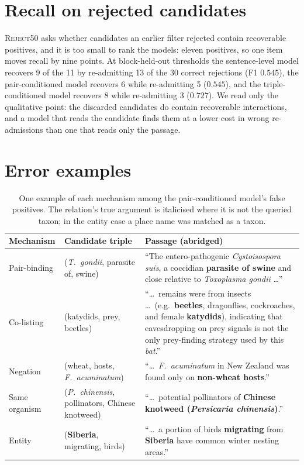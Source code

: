 \documentclass[11pt]{article}
\begin{document}
\section{Recall on rejected candidates}
\label{sec:recall}
\textsc{Reject50} asks whether candidates an earlier filter rejected contain recoverable
positives, and it is too small to rank the models: eleven positives, so one item moves recall by
nine points. At block-held-out thresholds the sentence-level model recovers 9 of the 11 by
re-admitting 13 of the 30 correct rejections (F1 $0.545$), the pair-conditioned model recovers 6
while re-admitting 5 ($0.545$), and the triple-conditioned model recovers 8 while re-admitting 3
($0.727$). We read only the qualitative point: the discarded candidates do contain recoverable
interactions, and a model that reads the candidate finds them at a lower cost in wrong
re-admissions than one that reads only the passage.

\section{Error examples}
\label{app:examples}

\begin{table}[t]\centering\small
\begin{tabular}{@{}llp{}@{}}
\toprule
Mechanism & Candidate triple & Passage (abridged) \\
\midrule
Pair-binding & (\emph{T.\ gondii}, parasite of, swine) &
``The entero-pathogenic \emph{Cystoisospora suis}, a coccidian \textbf{parasite of swine} and close
relative to \emph{Toxoplasma gondii} \ldots'' \\[1pt]
Co-listing & (katydids, prey, beetles) &
``\ldots\ remains were from insects \ldots\ (e.g.\ \textbf{beetles}, dragonflies, cockroaches, and
female \textbf{katydids}), indicating that eavesdropping on prey signals is not the only
prey-finding strategy used by this \emph{bat}.'' \\[1pt]
Negation & (wheat, hosts, \emph{F.\ acuminatum}) &
``\ldots\ \emph{F.\ acuminatum} in New Zealand was found only on \textbf{non-wheat hosts}.'' \\[1pt]
Same organism & (\emph{P.\ chinensis}, pollinators, Chinese knotweed) &
``\ldots\ potential pollinators of \textbf{Chinese knotweed (\emph{Persicaria chinensis})}.'' \\[1pt]
Entity & (\textbf{Siberia}, migrating, birds) &
``\ldots\ a portion of birds \textbf{migrating} from \textbf{Siberia} have common winter nesting
areas.'' \\
\bottomrule
\end{tabular}
\caption{One example of each mechanism among the pair-conditioned model's false positives. The
relation's true argument is italicised where it is not the queried taxon; in the entity case a
place name was matched as a taxon.}
\label{tab:examples}
\end{table}
\end{document}
